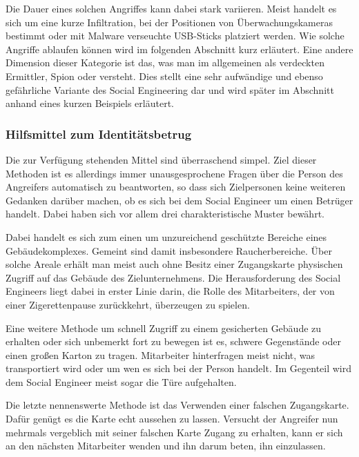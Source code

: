 Die Dauer eines solchen Angriffes kann dabei stark variieren. Meist handelt es sich um eine kurze Infiltration, bei der Positionen von Überwachungskameras bestimmt oder mit Malware verseuchte USB-Sticks  platziert werden. Wie solche Angriffe ablaufen können wird im folgenden Abschnitt kurz erläutert.
Eine andere Dimension dieser Kategorie ist das, was man im allgemeinen als verdeckten Ermittler, Spion oder  versteht. Dies stellt eine sehr aufwändige und ebenso gefährliche Variante des Social Engineering dar und wird später im Abschnitt  anhand eines kurzen Beispiels erläutert. \citep{hadnagy}\citep{hacking-the-human}

\subsubsection*{Hilfsmittel zum Identitätsbetrug}\label{sec:hilfsmittel-zum-identitätsbetrug}
Die zur Verfügung stehenden Mittel sind überraschend simpel. Ziel dieser Methoden ist es allerdings immer unausgesprochene Fragen über die Person des Angreifers automatisch zu beantworten, so dass sich Zielpersonen keine weiteren Gedanken darüber machen, ob es sich bei dem Social Engineer um einen Betrüger handelt. Dabei haben sich vor allem drei charakteristische Muster bewährt.

Dabei handelt es sich zum einen um unzureichend geschützte Bereiche eines Gebäudekomplexes. Gemeint sind damit insbesondere Raucherbereiche. Über solche Areale erhält man meist auch ohne Besitz einer Zugangskarte physischen Zugriff auf das Gebäude des Zielunternehmens.
Die Herausforderung des Social Engineers liegt dabei in erster Linie darin, die Rolle des Mitarbeiters, der von einer Zigerettenpause zurückkehrt, überzeugen zu spielen.

Eine weitere Methode um schnell Zugriff zu einem gesicherten Gebäude zu erhalten oder sich unbemerkt fort zu bewegen ist es, schwere Gegenstände oder einen großen Karton zu tragen. Mitarbeiter hinterfragen meist nicht, was transportiert wird oder um wen es sich bei der Person handelt. Im Gegenteil wird dem Social Engineer meist sogar die Türe aufgehalten.

Die letzte nennenswerte Methode ist das Verwenden einer falschen Zugangskarte. Dafür genügt es die Karte echt aussehen zu lassen. Versucht der Angreifer nun mehrmals vergeblich mit seiner falschen Karte Zugang zu erhalten, kann er sich an den nächsten Mitarbeiter wenden und ihn darum beten, ihn einzulassen.
\citep{hadnagy}

